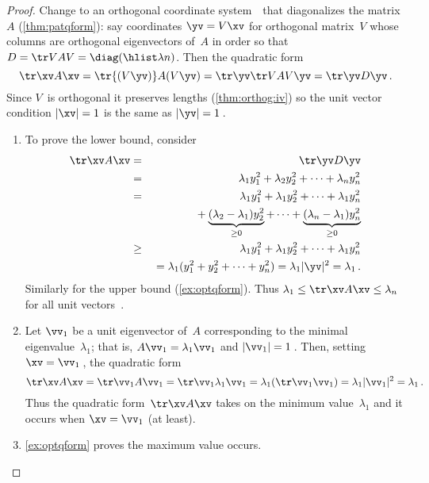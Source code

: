 \begin{proof} 
Change to an orthogonal coordinate system~\yv\ that diagonalizes the matrix~\(A\) (\cref{thm:patqform}): say coordinates \(\yv=V\xv\) for orthogonal matrix~\(V\) whose columns are orthogonal eigenvectors of~\(A\) in order so that \(D=\tr VAV=\diag(\hlist\lambda n)\).
Then the quadratic form 
\begin{equation*}
\tr\xv A\xv=\tr{(V\yv)} A(V\yv)=\tr\yv \tr VAV\yv=\tr\yv D\yv\,.
\end{equation*}
Since \(V\)~is orthogonal it preserves lengths (\cref{thm:orthog:iv}) so the unit vector condition \(|\xv|=1\) is the same as \(|\yv|=1\)\,.
\begin{enumerate}
\item To prove the lower bound, consider
\begin{eqnarray*}
\tr\xv A\xv&=&\tr\yv D\yv
\\&=&\lambda_1y_1^2+\lambda_2y_2^2+\cdots+\lambda_ny_n^2
\\&=&\lambda_1y_1^2+\lambda_1y_2^2+\cdots+\lambda_1y_n^2
\\&&\quad{}
+\underbrace{(\lambda_2-\lambda_1)y_2^2}_{\geq0}
+\cdots+\underbrace{(\lambda_n-\lambda_1)y_n^2}_{\geq0}
\\&\geq&\lambda_1y_1^2+\lambda_1y_2^2+\cdots+\lambda_1y_n^2
\\&&{}=\lambda_1(y_1^2+y_2^2+\cdots+y_n^2)
=\lambda_1|\yv|^2
=\lambda_1\,.
\end{eqnarray*}
Similarly for the upper bound (\cref{ex:optqform}).  
Thus \(\lambda_1\leq \tr\xv A\xv\leq\lambda_n\) for all unit vectors~\xv.

\item Let \(\vv_1\) be a unit eigenvector of~\(A\) corresponding to the minimal eigenvalue~\(\lambda_1\); that is, \(A\vv_1=\lambda_1\vv_1\) and \(|\vv_1|=1\)\,.
Then, setting \(\xv=\vv_1\)\,, the quadratic form
\begin{equation*}
\tr\xv A\xv=\tr\vv_1A\vv_1
=\tr\vv_1\lambda_1\vv_1
=\lambda_1(\tr\vv_1\vv_1)
=\lambda_1|\vv_1|^2
=\lambda_1\,.
\end{equation*}
Thus the quadratic form~\(\tr\xv A\xv\) takes on the minimum value~\(\lambda_1\) and it occurs when \(\xv=\vv_1\) (at least).

\item \cref{ex:optqform} proves the maximum value occurs.
\end{enumerate}
\end{proof}


